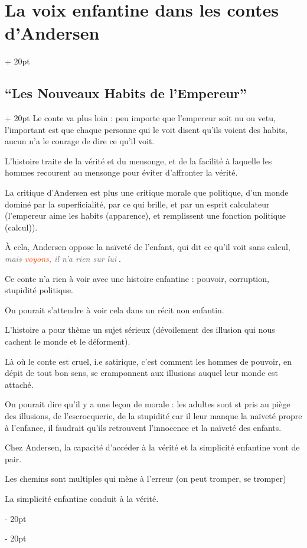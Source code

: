 \documentclass[a4paper, 12pt, twoside]{article}
\renewcommand{\emph}{\textcolor{ff4500}}
\newcommand{\simplecit}[1]{\guillemotleft$\;$#1$\;$\guillemotright}
\newcommand{\cit}[1]{\simplecit{\textcolor{656565}{#1}}}
\newcommand{\quo}[1]{\cit{\it #1}}
\newcommand{\ind}[1][20pt]{\advance\leftskip + #1}
\newcommand{\deind}[1][20pt]{\advance\leftskip - #1}
\newenvironment{indt}[2][20pt]{#2 \par \ind[#1]}{\par \deind} %
\begin{document}
\begin{indt}{\section{La voix enfantine dans les contes d'Andersen}}
\begin{indt}{\subsection{``Les Nouveaux Habits de l'Empereur''}}
            Le conte va plus loin : peu importe que l'empereur soit nu ou vetu, l'important est que chaque personne qui le voit disent qu'ils voient des habits, aucun n'a le courage de dire ce qu'il voit.
            
            L'histoire traite de la vérité et du mensonge, et de la facilité à laquelle les hommes recourent au mensonge pour éviter d'affronter la vérité.
            
            La critique d'Andersen est plus une critique morale que politique, d'un monde dominé par la superficialité, par ce qui brille, et par un esprit calculateur (l'empereur aime les habits (apparence), et remplissent une fonction politique (calcul)).
            
            \`A cela, Andersen oppose la naïveté de l'enfant, qui dit ce qu'il voit sans calcul, \quo{mais \emph{voyons}, il n'a rien sur lui}.
            
            Ce conte n'a rien à voir avec une histoire enfantine : pouvoir, corruption, stupidité politique.
            
            On pourait s'attendre à voir cela dans un récit non enfantin.
            
            
            L'histoire a pour thème un sujet sérieux (dévoilement des illusion qui nous cachent le monde et le déforment).
            
            Là où le conte est cruel, i.e satirique, c'est comment les hommes de pouvoir, en dépit de tout bon sens, se cramponnent aux illusions auquel leur monde est attaché.
            
            On pourait dire qu'il y a une leçon de morale : les adultes sont st pris au piège des illusions, de l'escrocquerie, de la stupidité car il leur manque la naïveté propre à l'enfance, il faudrait qu'ils retrouvent l'innocence et la naïveté des enfants.
            
            Chez Andersen, la capacité d'accéder à la vérité et la simplicité enfantine vont de pair.
            
            
            Les chemins sont multiples qui mène à l'erreur (on peut tromper, se tromper)
            
            La simplicité enfantine conduit à la vérité.
            

\end{indt}
\end{indt}
\end{document}
